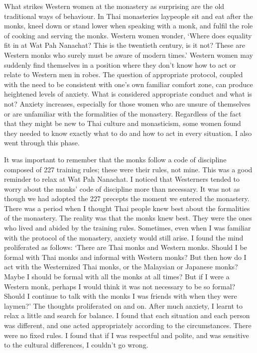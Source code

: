 What strikes Western women at the monastery as surprising are the old
traditional ways of behaviour. In Thai monasteries laypeople sit and eat
after the monks, kneel down or stand lower when speaking with a monk, 
and fulfil the role of cooking and serving the monks. Western women
wonder, `Where does equality fit in at Wat Pah Nanachat? This is the
twentieth century, is it not? These are Western monks who surely must be
aware of modern times.' Western women may suddenly find themselves in a
position where they don't know how to act or relate to Western men in
robes. The question of appropriate protocol, coupled with the need to be
consistent with one's own familiar comfort zone, can produce heightened
levels of anxiety. What is considered appropriate conduct and what is
not? Anxiety increases, especially for those women who are unsure of
themselves or are unfamiliar with the formalities of the monastery. 
Regardless of the fact that they might be new to Thai culture and
monasticism, some women found they needed to know exactly what to do and
how to act in every situation. I also went through this phase. 

It was important to remember that the monks follow a code of discipline
composed of 227 training rules; these were their rules, not mine. This
was a good reminder to relax at Wat Pah Nanachat. I noticed that
Westerners tended to worry about the monks' code of discipline more than
necessary. It was not as though we had adopted the 227 precepts the
moment we entered the monastery. There was a period when I thought Thai
people knew best about the formalities of the monastery. The reality was
that the monks knew best. They were the ones who lived and abided by the
training rules. Sometimes, even when I was familiar with the protocol of
the monastery, anxiety would still arise. I found the mind proliferated
as follows: `There are Thai monks and Western monks. Should I be formal
with Thai monks and informal with Western monks? But then how do I act
with the Westernized Thai monks, or the Malaysian or Japanese monks? 
Maybe I should be formal with all the monks at all times? But if I were
a Western monk, perhaps I would think it was not necessary to be so
formal? Should I continue to talk with the monks I was friends with when
they were laymen?' The thoughts proliferated on and on. After much
anxiety, I learnt to relax a little and search for balance. I found that
each situation and each person was different, and one acted
appropriately according to the circumstances. There were no fixed rules. 
I found that if I was respectful and polite, and was sensitive to the
cultural differences, I couldn't go wrong. 

